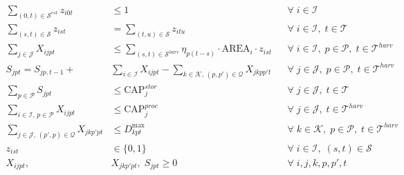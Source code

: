 \documentclass[preprint,review,1p,authoryear]{elsarticle} %
\begin{document}
\begin{align}
  \sum_{(0,t) \in \mathcal{S}^{{est}}} z_{i0t} &\leq 1 && \forall\; i \in \mathcal{I}\label{eq:C1} \\[2pt]
  \sum_{(s,t) \in \mathcal{S}} z_{ist} &= \sum_{(t,u) \in \mathcal{S}} z_{itu} && \forall\; i \in \mathcal{I},\; t \in \mathcal{T}\label{eq:C2} \\[2pt]
  \sum_{j \in \mathcal{J}} X_{ijpt}    &\leq \sum_{(s,t) \in \mathcal{S}^{{harv}}} \eta_{p(t-s)} \cdot \text{AREA}_i \cdot z_{ist} && \forall\; i \in \mathcal{I},\; p \in \mathcal{P},\; t \in \mathcal{T}^{{harv}}     \label{eq:C3} \\[2pt]
  S_{jpt}    = S_{jp,t-1} + &\sum_{i \in \mathcal{I}} X_{ijpt} - \sum_{k \in \mathcal{K},\,(p,p') \in \mathcal{Q}} X_{jkpp't}   && \forall\; j \in \mathcal{J},\; p \in \mathcal{P},\; t \in \mathcal{T}^{harv}  \label{eq:C5} \\[2pt]
  \sum_{p \in \mathcal{P}} S_{jpt}    &\leq \text{CAP}^{{stor}}_j    && \forall\; j \in \mathcal{J},\; t \in \mathcal{T}\label{eq:C6} \\[2pt]
  \sum_{i \in \mathcal{I},\, p \in \mathcal{P}} X_{ijpt}  &\leq \text{CAP}^{{proc}}_j && \forall\; j \in \mathcal{J},\; t \in \mathcal{T}^{harv} \label{eq:C7} \\[2pt]
  \sum_{j \in \mathcal{J},\,(p',p) \in \mathcal{Q}} X_{jkp'pt} &\leq D^{\max}_{kpt} && \forall\; k \in \mathcal{K},\; p \in \mathcal{P},\; t \in \mathcal{T}^{harv}     \label{eq:C8} \\[2pt]
  z_{ist} &\in \{0,1\} && \forall\; i \in \mathcal{I},\; (s,t) \in \mathcal{S}\label{eq:D1} \\[2pt]
  X_{ijpt},\; &X_{jkp'pt},\; S_{jpt} \geq 0 && \forall\; i,j,k,p,p',t     \label{eq:D2}
\end{align}
\end{document}
